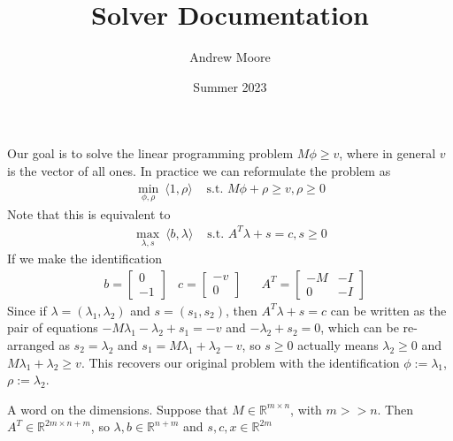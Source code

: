 \documentclass{article}
\title{Solver Documentation}
\author{Andrew Moore}
\date{Summer 2023}
\newcommand{\R}{{\mathbb{R}}}
\begin{document}
\maketitle

Our goal is to solve the linear programming problem $M\phi \geq v$, where in general $v$ is the vector of all ones. In practice we can reformulate the problem as 
\begin{align*}
		\min_{\phi, \rho}\ \langle 1, \rho\rangle &\text{ s.t. } M\phi + \rho \geq v, \rho \geq 0
\end{align*}
Note that this is equivalent to
\begin{align*}
		\max_{\lambda, s}\ \langle b, \lambda \rangle &\text{ s.t. } A^T \lambda + s = c, s \geq 0
\end{align*}
If we make the identification
\begin{align*}
		&b = \begin{bmatrix}
				0\\
				-1\end{bmatrix} 
		&c = \begin{bmatrix}
				-v\\
				0\end{bmatrix}
		&&A^T = \begin{bmatrix}
				-M & -I\\
				0  & -I
		\end{bmatrix}
\end{align*}
Since if $\lambda = (\lambda_1, \lambda_2)$ and $s = (s_1, s_2)$, then $A^T\lambda + s = c$ can be written as the pair of equations $-M\lambda_1 - \lambda_2 + s_1 = -v$ and $-\lambda_2 + s_2 = 0$, which can be re-arranged as $s_2 = \lambda_2$ and $s_1 = M\lambda_1 + \lambda_2 - v$, so $s \geq 0$ actually means $\lambda_2 \geq 0$ and $M\lambda_1 + \lambda_2 \geq v$. This recovers our original problem with the identification $\phi := \lambda_1$, $\rho := \lambda_2$. 

A word on the dimensions. Suppose that $M \in \R^{m \times n}$, with $m >> n$. Then $A^T \in \R^{2m \times n+m}$, so $\lambda, b \in \R^{n+m}$ and $s, c, x \in \R^{2m}$ 
\end{document}
